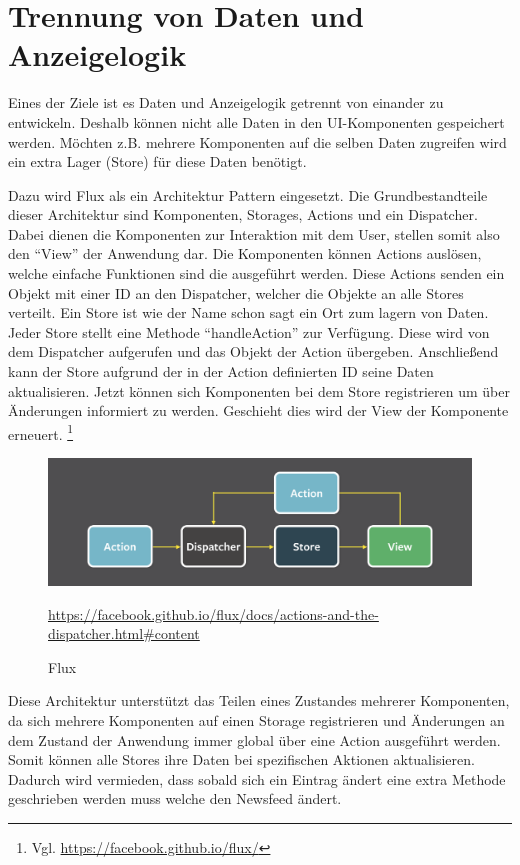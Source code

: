 \section{Trennung von Daten und Anzeigelogik}
Eines der Ziele ist es Daten und Anzeigelogik getrennt von einander zu entwickeln. 
Deshalb können nicht alle Daten in den UI-Komponenten gespeichert werden. Möchten z.B. mehrere Komponenten auf die selben 
Daten zugreifen wird ein extra Lager (Store) für diese Daten benötigt.

Dazu wird Flux als ein Architektur Pattern eingesetzt.
Die Grundbestandteile dieser Architektur sind Komponenten, Storages, Actions und ein Dispatcher.
Dabei dienen die Komponenten zur Interaktion mit dem User, stellen somit also den \enquote{View} der Anwendung dar.
Die Komponenten können Actions auslösen, welche einfache Funktionen sind die ausgeführt werden.
Diese Actions senden ein Objekt mit einer ID an den Dispatcher, welcher die Objekte an alle Stores verteilt.
Ein Store ist wie der Name schon sagt ein Ort zum lagern von Daten. Jeder Store stellt eine Methode \enquote{handleAction} zur Verfügung.
Diese wird von dem Dispatcher aufgerufen und das Objekt der Action übergeben. 
Anschließend kann der Store aufgrund der in der Action definierten ID seine Daten aktualisieren.
Jetzt können sich Komponenten bei dem Store registrieren um über Änderungen informiert zu werden.
Geschieht dies wird der View der Komponente erneuert. \footnote{Vgl. \url{https://facebook.github.io/flux/}}
\begin{figure}[H]
    \includegraphics[width=\textwidth]{images/flux.png}
    \caption{Flux}
    \url{https://facebook.github.io/flux/docs/actions-and-the-dispatcher.html#content}
\end{figure}

Diese Architektur unterstützt das Teilen eines Zustandes mehrerer Komponenten, da sich mehrere Komponenten auf einen Storage registrieren 
und Änderungen an dem Zustand der Anwendung immer global über eine Action ausgeführt werden. Somit können alle Stores ihre Daten bei spezifischen Aktionen aktualisieren.
Dadurch wird vermieden, dass sobald sich ein Eintrag ändert eine extra Methode geschrieben werden muss welche den Newsfeed ändert.

